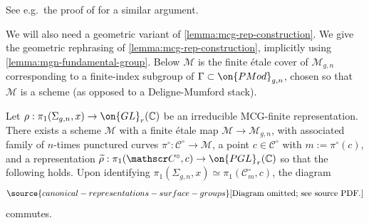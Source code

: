 See e.g.~the proof of \cite[Theorem 4]{simpson1992higgs} for a similar argument.

We will also need a geometric variant of \autoref{lemma:mcg-rep-construction}.
We give the geometric rephrasing of \autoref{lemma:mcg-rep-construction},
implicitly using \autoref{lemma:mgn-fundamental-group}. Below $\mathscr{M}$ is
the finite \'etale cover of $\mathscr{M}_{g,n}$ corresponding to a finite-index subgroup of $\Gamma\subset \on{PMod}_{g,n}$, chosen so that $\mathscr{M}$ is a scheme (as opposed to a Deligne-Mumford stack).

\begin{lemma}
\notready
	\label{lemma:geometric-mcg-rep-construction}
	Let
	$\rho: \pi_1(\Sigma_{g,n},x) \to \on{GL}_r(\mathbb C)$ be an irreducible MCG-finite representation.
	There exists a scheme $\mathscr M$ with a finite \'etale map $\mathscr M \to \mathscr
	M_{g,n}$, with associated family of $n$-times punctured curves $\pi^\circ: \mathscr{C}^\circ\to \mathscr{M}$, a point $c\in \mathscr{C}^\circ$ with $m:=\pi^\circ(c)$,
	and a representation $\widetilde{\rho}: \pi_1(\mathscr C^\circ, c) \to
	\on{PGL}_r(\mathbb C)$ so that the following holds. Upon identifying
	$\pi_1(\Sigma_{g,n},x)  \simeq \pi_1(\mathscr C^\circ_m,c)$, the diagram
	\begin{equation}
		\label{equation:geometric-rho-and-tilde-rho}
\source{canonical-representations-surface-groups}
		\text{[Diagram omitted; see source PDF.]}\end{equation}
	commutes.
\end{lemma}



